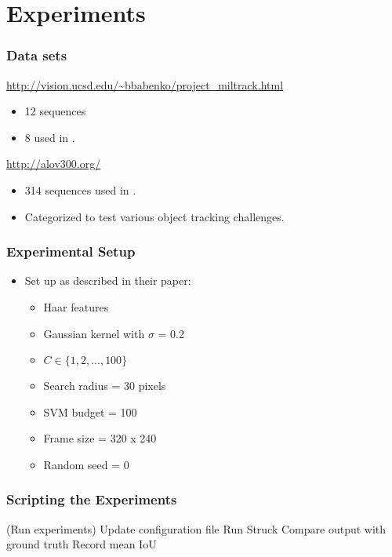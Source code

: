 \section{Experiments}

\begin{frame}
    \frametitle{Data sets}
    \url{http://vision.ucsd.edu/~bbabenko/project_miltrack.html}
    \begin{itemize}
        \item 12 sequences
        \item 8 used in \cite{6126251}.
    \end{itemize}
    \url{http://alov300.org/}
    \begin{itemize}
        \item 314 sequences used in \cite{6671560}.
        \item Categorized to test various object tracking challenges.
    \end{itemize}
\end{frame}

\begin{frame}
    \frametitle{Experimental Setup}
    \begin{itemize}
        \item Set up as described in their paper:
            \begin{itemize}
                \item Haar features
                \item Gaussian kernel with \(\sigma\) = 0.2
                \item \(C \in \{1, 2, ..., 100\}\)
                \item Search radius = 30 pixels
                \item SVM budget = 100
                \item Frame size = 320 x 240
                \item Random seed = 0
            \end{itemize}
    \end{itemize}
\end{frame}

\begin{frame}
    \frametitle{Scripting the Experiments}
    \begin{algorithm}[H]
        \DontPrintSemicolon
        \Begin(Run experiments)
        {
            {
                {
                    Update configuration file\;
                    Run Struck\;
                    Compare output with ground truth\;
                    Record mean IoU\;
                }
            }
        }
    \end{algorithm}
\end{frame}

